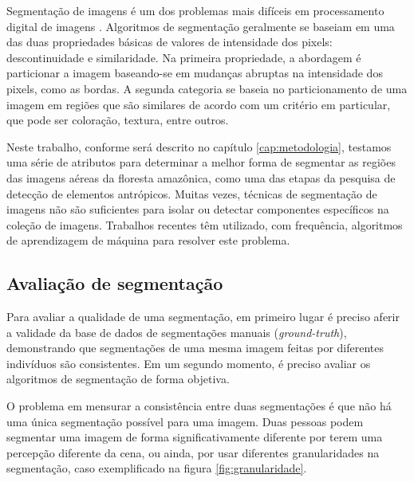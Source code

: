 Segmentação de imagens é um dos problemas mais difíceis em processamento digital de imagens \cite{gonzalez:2002}. Algoritmos de segmentação geralmente se baseiam em uma das duas propriedades básicas de valores de intensidade dos pixels: descontinuidade e similaridade. Na primeira propriedade, a abordagem é particionar a imagem baseando-se em mudanças abruptas na intensidade dos pixels, como as bordas. A segunda categoria se baseia no particionamento de uma imagem em regiões que são similares de acordo com um critério em particular, que pode ser coloração, textura, entre outros.

Neste trabalho, conforme será descrito no capítulo \ref{cap:metodologia}, testamos uma série de atributos para determinar a melhor forma de segmentar as regiões das imagens aéreas da floresta amazônica, como uma das etapas da pesquisa de detecção de elementos antrópicos. Muitas vezes, técnicas de segmentação de imagens não são suficientes para isolar ou detectar componentes específicos na coleção de imagens. Trabalhos recentes têm utilizado, com frequência, algoritmos de aprendizagem de máquina para resolver este problema.


\subsection{Avaliação de segmentação}\label{sec:avaliacaopdi}

Para avaliar a qualidade de uma segmentação, em primeiro lugar é preciso aferir a validade da base de dados de segmentações manuais (\textit{ground-truth}), demonstrando que segmentações de uma mesma imagem feitas por diferentes indivíduos são consistentes. Em um segundo momento, é preciso avaliar os algoritmos de segmentação de forma objetiva.

O problema em mensurar a consistência entre duas segmentações é que não há uma única segmentação possível para uma imagem. Duas pessoas podem segmentar uma imagem de forma significativamente diferente por terem uma percepção diferente da cena, ou ainda, por usar diferentes granularidades na segmentação, caso exemplificado na figura \ref{fig:granularidade}.

